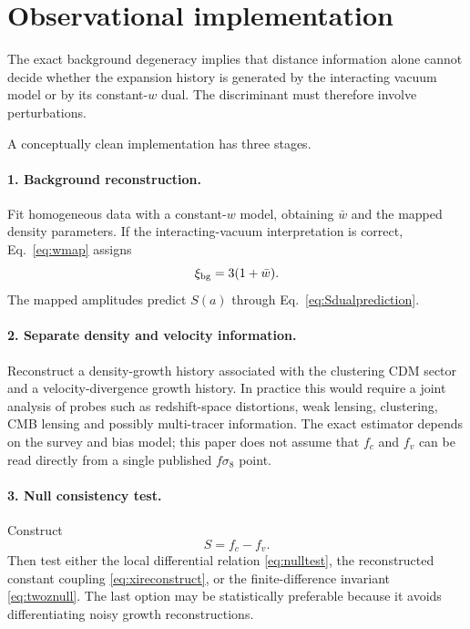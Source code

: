 \documentclass[11pt]{article}
\theoremstyle{remark}
\begin{document}
\section{Observational implementation}
\label{sec:observational}

The exact background degeneracy implies that distance information alone cannot decide whether the expansion history is generated by the interacting vacuum model or by its constant-$w$ dual.  The discriminant must therefore involve perturbations.

A conceptually clean implementation has three stages.

\paragraph{1. Background reconstruction.}
Fit homogeneous data with a constant-$w$ model, obtaining $\bar w$ and the mapped density parameters.  If the interacting-vacuum interpretation is correct, Eq.~\eqref{eq:wmap} assigns
\begin{equation}
    \xi_{\rm bg}=3(1+\bar w).
\end{equation}
The mapped amplitudes predict $S(a)$ through Eq.~\eqref{eq:Sdualprediction}.

\paragraph{2. Separate density and velocity information.}
Reconstruct a density-growth history associated with the clustering CDM sector and a velocity-divergence growth history.  In practice this would require a joint analysis of probes such as redshift-space distortions, weak lensing, clustering, CMB lensing and possibly multi-tracer information.  The exact estimator depends on the survey and bias model; this paper does not assume that $f_c$ and $f_v$ can be read directly from a single published $f\sigma_8$ point.

\paragraph{3. Null consistency test.}
Construct
\begin{equation}
    S=f_c-f_v.
\end{equation}
Then test either the local differential relation \eqref{eq:nulltest}, the reconstructed constant coupling \eqref{eq:xireconstruct}, or the finite-difference invariant \eqref{eq:twoznull}.  The last option may be statistically preferable because it avoids differentiating noisy growth reconstructions.
\end{document}
